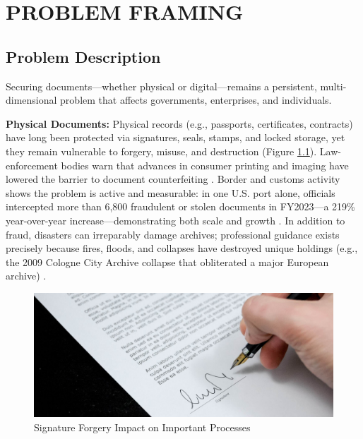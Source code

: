 


\chapter{PROBLEM FRAMING}
\section{Problem Description}
Securing documents—whether physical or digital—remains a persistent, multi-dimensional problem that affects governments, enterprises, and individuals.

\textbf{Physical Documents:} Physical records (e.g., passports, certificates, contracts) have long been protected via signatures, seals, stamps, and locked storage, yet they remain vulnerable to forgery, misuse, and destruction (Figure \ref{signature-forgery}). Law-enforcement bodies warn that advances in consumer printing and imaging have lowered the barrier to document counterfeiting \cite{interpol_identity_nodate}. Border and customs activity shows the problem is active and measurable: in one U.S. port alone, officials intercepted more than 6,800 fraudulent or stolen documents in FY2023—a 219\% year-over-year increase—demonstrating both scale and growth \cite{us_customs_and_border_protection_cincinnati_nodate}. In addition to fraud, disasters can irreparably damage archives; professional guidance exists precisely because fires, floods, and collapses have destroyed unique holdings (e.g., the 2009 Cologne City Archive collapse that obliterated a major European archive) \cite{international_council_on_archives_emergency_nodate,geoengineerorg_cologne_nodate}.

\begin{figure}[H]
    \centering
    \includegraphics[width=18cm]{"images/signature-forgery.jpg"}
    \caption{Signature Forgery Impact on Important Processes}
    \label{signature-forgery}
\end{figure}

